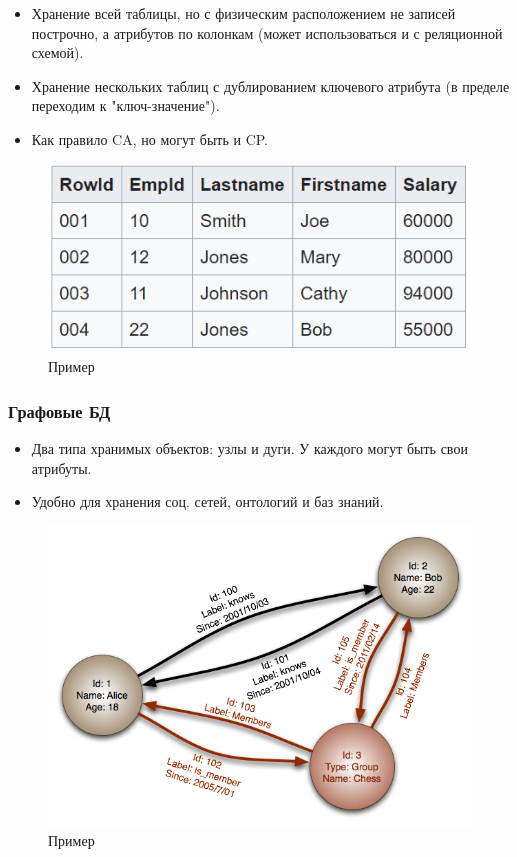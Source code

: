 \documentclass{article}
\begin{document}
 \begin{itemize}
     \item Хранение всей таблицы, но с физическим расположением не записей построчно, а атрибутов по колонкам (может использоваться и с реляционной схемой).
     \item Хранение нескольких таблиц с дублированием ключевого атрибута (в пределе переходим к "ключ-значение").
     \item Как правило CA, но могут быть и CP.
 \end{itemize}
 
 \begin{figure}[H]
    \centering
    \includegraphics[width = .7\linewidth]{img2}
    \caption{Пример}
\end{figure}
 
 \subsubsection{Графовые БД}
 
 \begin{itemize}
     \item Два типа хранимых объектов: узлы и дуги. У каждого могут быть свои атрибуты.
     \item Удобно для хранения соц. сетей, онтологий и баз знаний.
 \end{itemize}
 
\begin{figure}[H]
    \centering
    \includegraphics[width = .7\linewidth]{img1}
    \caption{Пример}
\end{figure}
 
\end{document}
